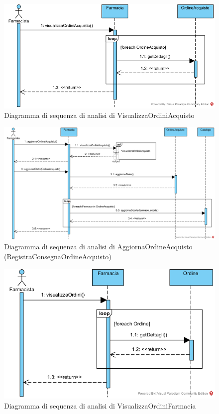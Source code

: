 \begin{figure}[!hbp]
	\centering
	\includegraphics[width=0.8\linewidth]{assets/sequence_analisi/VisualizzaOrdiniAcquisto.png}
	\caption{Diagramma di sequenza di analisi di VisualizzaOrdiniAcquisto}
\end{figure}

\begin{figure}[!hbp]
	\centering
	\includegraphics[width=\linewidth]{assets/sequence_analisi/AggiornaOrdineAcquisto.png}
	\caption{Diagramma di sequenza di analisi di AggiornaOrdineAcquisto (RegistraConsegnaOrdineAcquisto)}
\end{figure}

\begin{figure}[!hbp]
	\centering
	\includegraphics[width=0.9\linewidth]{assets/sequence_analisi/VisualizzaOrdiniFarmacia.png}
	\caption{Diagramma di sequenza di analisi di VisualizzaOrdiniFarmacia}
\end{figure}

